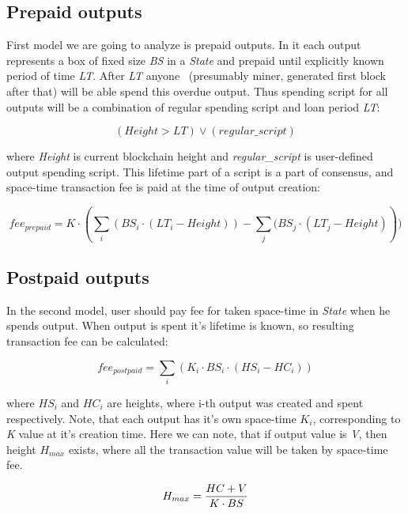 \documentclass[]{article}   %
\newcommand{\state}{\textit{State}}
\begin{document}
\subsection{Prepaid outputs}

First model we are going to analyze is prepaid outputs. In it each output represents a box of fixed size \textit{BS} in a \state{} and prepaid until explicitly known period of time \textit{LT}. After \textit{LT} anyone ~(presumably miner, generated first block after that) will be able spend this overdue output. Thus spending script for all outputs will be a combination of regular spending script and loan period \textit{LT}:

\begin{equation}
(Height > LT) \lor (regular\_script)
\end{equation}

where \textit{Height} is current blockchain height and \textit{regular\_script} is user-defined output spending script. This lifetime part of a script is a part of consensus, and space-time transaction fee is paid at the time of output creation:

\begin{equation}
fee_{prepaid} = K \cdot (\sum_i{(BS_i \cdot (LT_i - Height))} - \sum_j{(BS_j \cdot (LT_j - Height)}))
\end{equation}

\subsection{Postpaid outputs}

In the second model, user should pay fee for taken space-time in \state{} when he spends output. When output is spent it's lifetime is known, so resulting transaction fee can be calculated:

\begin{equation}
fee_{postpaid} = \sum_i{(K_i \cdot BS_i \cdot (HS_i - HC_i))}
\end{equation}

where \textit{$HS_i$} and \textit{$HC_i$} are heights, where i-th output was created and spent respectively. Note, that each output has it's own space-time \textit{$K_i$}, corresponding to \textit{K} value at it's creation time. Here we can note, that if output value is \textit{V}, then height \textit{$H_{max}$} exists, where all the transaction value will be taken by space-time fee.

\begin{equation}
H_{max} = {{HC + V} \over {K \cdot BS}}
\end{equation}
\end{document}
